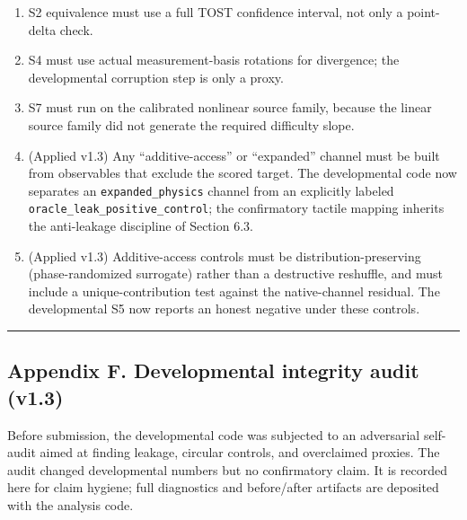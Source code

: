 \documentclass[
  11pt,
]{article}
\providecommand{\tightlist}{%
  \setlength{\itemsep}{0pt}\setlength{\parskip}{0pt}}
\begin{document}
\begin{enumerate}
\def\labelenumi{\arabic{enumi}.}
\tightlist
\item
  S2 equivalence must use a full TOST confidence
  interval, not only a point-delta check.
\item
  S4 must use actual measurement-basis rotations
  for divergence; the developmental corruption
  step is only a proxy.
\item
  S7 must run on the calibrated nonlinear source
  family, because the linear source family did
  not generate the required difficulty slope.
\item
  (Applied v1.3) Any ``additive-access'' or
  ``expanded'' channel must be built from
  observables that exclude the scored target.
  The developmental code now separates an
  \texttt{expanded\_physics} channel from an
  explicitly labeled
  \texttt{oracle\_leak\_positive\_control}; the
  confirmatory tactile mapping inherits the
  anti-leakage discipline of Section 6.3.
\item
  (Applied v1.3) Additive-access controls must
  be distribution-preserving (phase-randomized
  surrogate) rather than a destructive
  reshuffle, and must include a
  unique-contribution test against the
  native-channel residual. The developmental S5
  now reports an honest negative under these
  controls.
\end{enumerate}

\begin{center}\rule{0.5\linewidth}{0.5pt}\end{center}

\subsection{Appendix F. Developmental integrity
audit
(v1.3)}\label{appendix-f.-developmental-integrity-audit-v1.3}

Before submission, the developmental code was
subjected to an adversarial self-audit aimed at
finding leakage, circular controls, and
overclaimed proxies. The audit changed
developmental numbers but no confirmatory claim.
It is recorded here for claim hygiene; full
diagnostics and before/after artifacts are
deposited with the analysis code.
\end{document}
